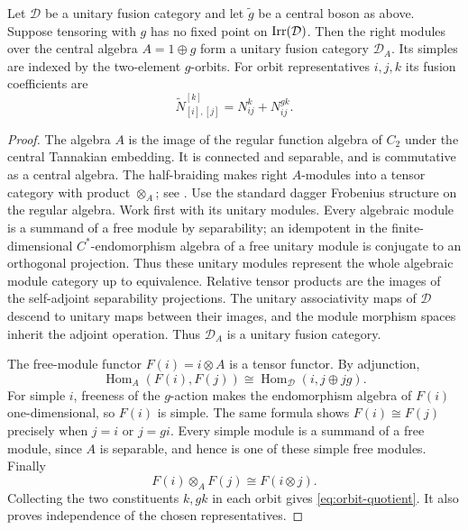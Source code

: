 \begin{proposition}\label{prop:central-boson}
Let $\mathcal D$ be a unitary fusion category and let $\widetilde g$ be
a central boson as above. Suppose tensoring with $g$ has no fixed point
on $\operatorname{Irr}(\mathcal D)$. Then the right modules over the central algebra
$A=1\oplus g$ form a unitary fusion category $\mathcal D_A$. Its simples
are indexed by the two-element $g$-orbits. For orbit representatives
$i,j,k$ its fusion coefficients are
\begin{equation}\label{eq:orbit-quotient}
 \widetilde N_{[i],[j]}^{[k]}=N_{ij}^{k}+N_{ij}^{gk}.
\end{equation}
\end{proposition}
\begin{proof}
The algebra $A$ is the image of the regular function algebra of $C_2$
under the central Tannakian embedding. It is connected and separable,
and is commutative as a central algebra. The half-braiding makes right
$A$-modules into a tensor category with product $\otimes_A$; see
\cite[Theorem~8.23.3]{EGNO}. Use the standard dagger Frobenius structure on the regular algebra.
Work first with its unitary modules. Every algebraic module is a
summand of a free module by separability; an idempotent in the
finite-dimensional $C^*$-endomorphism algebra of a free unitary module
is conjugate to an orthogonal projection. Thus these unitary modules
represent the whole algebraic module category up to equivalence.
Relative tensor products are the images of the self-adjoint
separability projections. The unitary associativity maps of $\mathcal D$ descend
to unitary maps between their images, and the module morphism spaces
inherit the adjoint operation. Thus $\mathcal D_A$ is a unitary fusion
category.

The free-module functor $F(i)=i\otimes A$ is a tensor functor. By
adjunction,
\[
 \operatorname{Hom}_A(F(i),F(j))
 \cong\operatorname{Hom}_{\mathcal D}(i,j\oplus jg).
\]
For simple $i$, freeness of the $g$-action makes the endomorphism
algebra of $F(i)$ one-dimensional, so $F(i)$ is simple. The same formula
shows $F(i)\cong F(j)$ precisely when $j=i$ or $j=gi$. Every simple
module is a summand of a free module, since $A$ is separable, and hence
is one of these simple free modules. Finally
\[
 F(i)\otimes_A F(j)\cong F(i\otimes j).
\]
Collecting the two constituents $k,gk$ in each orbit gives
\eqref{eq:orbit-quotient}. It also proves independence of the chosen
representatives.
\end{proof}

